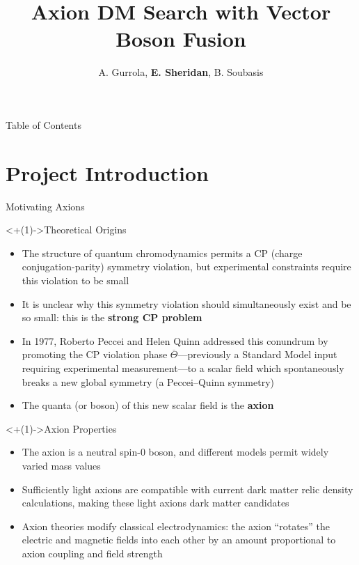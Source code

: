 \documentclass[handout]{beamer}
\title[VBF Axion DM Search]{Axion DM Search with Vector Boson Fusion}
\author[E. Sheridan]{A. Gurrola\inst{1}, \textbf{E. Sheridan}\inst{1}, B. Soubasis\inst{1}}
\institute{Vanderbilt University\inst{1}}
\begin{document}
\frame{\titlepage}

\begin{frame}{Table of Contents}
\tableofcontents
\end{frame}



%
%
\section{Project Introduction}

\begin{frame}{Motivating Axions}
    \begin{block}<+(1)->{Theoretical Origins}
        \begin{itemize}[<+(1)->]
            \item The structure of quantum chromodynamics permits a CP (charge conjugation-parity) symmetry violation, but experimental constraints require this violation to be small 
            \item It is unclear why this symmetry violation should simultaneously exist and be so small: this is the \textbf{strong CP problem} 
            \item In 1977, Roberto Peccei and Helen Quinn addressed this conundrum by promoting the CP violation phase $\overline{\Theta}$---previously a Standard Model input requiring experimental measurement---to a scalar field which spontaneously breaks a new global symmetry (a Peccei–Quinn symmetry)
            \item The quanta (or boson) of this new scalar field is the \textbf{axion}
        \end{itemize}
    \end{block}
    \begin{block}<+(1)->{Axion Properties}
        \begin{itemize}[<+(1)->]
            \item The axion is a neutral spin-$0$ boson, and different models permit widely varied mass values
            \item Sufficiently light axions are compatible with current dark matter relic density calculations, making these light axions dark matter candidates
            \item Axion theories modify classical electrodynamics: the axion ``rotates'' the electric and magnetic fields into each other by an amount proportional to axion coupling and field strength 

\end{itemize}
\end{block}
\end{frame}
\end{document}
